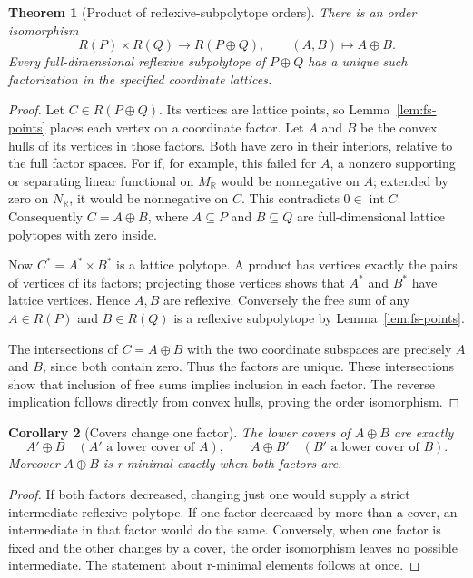 \documentclass[manuscript]{aomart}
\newtheorem{theorem}{Theorem}
\newtheorem{corollary}[theorem]{Corollary}
\theoremstyle{definition}
\theoremstyle{remark}
\newcommand{\R}{\mathbb{R}}
\begin{document}
\begin{theorem}[Product of reflexive-subpolytope orders]\label{thm:fs-order}
There is an order isomorphism
\[
 R(P)\times R(Q)\longrightarrow R(P\oplus Q),\qquad
 (A,B)\longmapsto A\oplus B.
\]
Every full-dimensional reflexive subpolytope of $P\oplus Q$ has a unique
such factorization in the specified coordinate lattices.
\end{theorem}
\begin{proof}
Let $C\in R(P\oplus Q)$. Its vertices are lattice points, so
Lemma~\ref{lem:fs-points} places each vertex on a coordinate factor.
Let $A$ and $B$ be the convex hulls of its vertices in those factors.
Both have zero in their interiors, relative to the full factor spaces.
For if, for example, this failed for $A$, a nonzero supporting or
separating linear functional on $M_\R$ would be nonnegative on $A$;
extended by zero on $N_\R$, it would be nonnegative on $C$. This
contradicts $0\in\operatorname{int}C$.
Consequently $C=A\oplus B$, where $A\subseteq P$ and $B\subseteq Q$
are full-dimensional lattice polytopes with zero inside.

Now $C^*=A^*\times B^*$ is a lattice polytope. A product has vertices
exactly the pairs of vertices of its factors; projecting those vertices
shows that $A^*$ and $B^*$ have lattice vertices. Hence $A,B$ are
reflexive. Conversely the free sum of any $A\in R(P)$ and $B\in R(Q)$
is a reflexive subpolytope by Lemma~\ref{lem:fs-points}.

The intersections of $C=A\oplus B$ with the two coordinate subspaces
are precisely $A$ and $B$, since both contain zero. Thus the factors are
unique. These intersections show that inclusion of free sums implies
inclusion in each factor. The reverse implication follows directly
from convex hulls, proving the order isomorphism.
\end{proof}

\begin{corollary}[Covers change one factor]\label{cor:fs-covers}
The lower covers of $A\oplus B$ are exactly
\[
 A'\oplus B\quad(A'\text{ a lower cover of }A),\qquad
 A\oplus B'\quad(B'\text{ a lower cover of }B).
\]
Moreover $A\oplus B$ is r-minimal exactly when both factors are.
\end{corollary}
\begin{proof}
If both factors decreased, changing just one would supply a strict
intermediate reflexive polytope. If one factor decreased by more than a
cover, an intermediate in that factor would do the same. Conversely,
when one factor is fixed and the other changes by a cover, the order
isomorphism leaves no possible intermediate. The statement about
r-minimal elements follows at once.
\end{proof}
\end{document}
